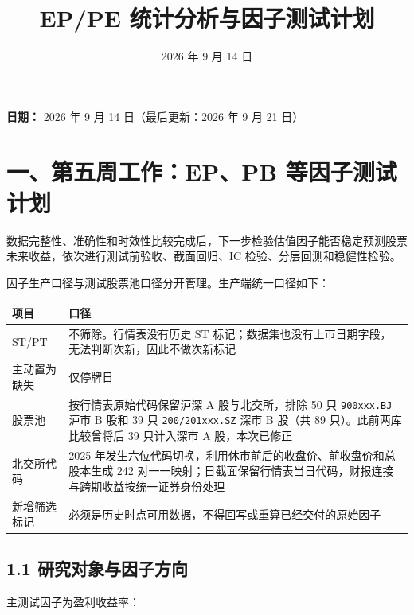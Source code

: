 \documentclass[UTF8,a4paper,11pt]{ctexart}
\title{\textbf{EP/PE 统计分析与因子测试计划}}
\author{}
\date{2026 年 9 月 14 日}
\begin{document}
\maketitle
\tableofcontents
\newpage

\textbf{日期：} 2026 年 9 月 14 日（最后更新：2026 年 9 月 21 日）

\begin{quote}
\end{quote}

{}
\section*{一、第五周工作：EP、PB 等因子测试计划}

数据完整性、准确性和时效性比较完成后，下一步检验估值因子能否稳定预测股票未来收益，依次进行测试前验收、截面回归、IC 检验、分层回测和稳健性检验。

因子生产口径与测试股票池口径分开管理。生产端统一口径如下：

\begin{table}[htbp]
\centering
\begin{tabularx}{\textwidth}{@{}YY@{}}
\toprule
项目 & 口径 \\
\midrule
ST/PT & 不筛除。行情表没有历史 ST 标记；数据集也没有上市日期字段，无法判断次新，因此不做次新标记 \\
主动置为缺失 & 仅停牌日 \\
股票池 & 按行情表原始代码保留沪深 A 股与北交所，排除 50 只 \texttt{900xxx.BJ} 沪市 B 股和 39 只 \texttt{200/201xxx.SZ} 深市 B 股（共 89 只）。此前两库比较曾将后 39 只计入深市 A 股，本次已修正 \\
北交所代码 & 2025 年发生六位代码切换，利用休市前后的收盘价、前收盘价和总股本生成 242 对一一映射；日截面保留行情表当日代码，财报连接与跨期收益按统一证券身份处理 \\
新增筛选标记 & 必须是历史时点可用数据，不得回写或重算已经交付的原始因子 \\
\bottomrule
\end{tabularx}
\end{table}

{}
\subsection*{1.1 研究对象与因子方向}

主测试因子为盈利收益率：
\end{document}
